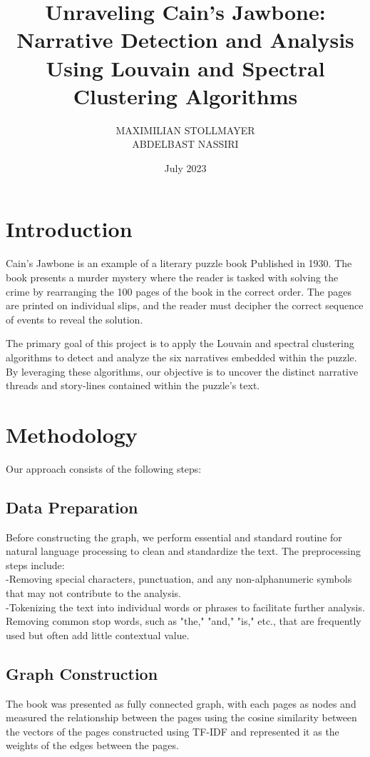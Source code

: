 \documentclass{article}
\title{Unraveling Cain's Jawbone: Narrative Detection and Analysis Using Louvain and Spectral Clustering Algorithms}
\author{MAXIMILIAN STOLLMAYER \\ 
ABDELBAST NASSIRI}
\date{July 2023}
\begin{document}
\maketitle

\section{Introduction}
Cain's Jawbone  is an example of a literary puzzle book Published in 1930. The book presents a murder mystery where the reader is tasked with solving the crime by rearranging the 100 pages of the book in the correct order. The pages are printed on individual slips, and the reader must decipher the correct sequence of events to reveal the solution.

The primary goal of this project is to apply the Louvain and spectral clustering algorithms to detect and analyze the six narratives embedded within the puzzle. By leveraging these algorithms, our objective is to uncover the distinct narrative threads and story-lines contained within the puzzle's text.
\section{Methodology}
Our approach consists of the following steps:

\subsection{Data Preparation}
Before constructing the graph, we perform essential and standard routine for natural language processing to clean and standardize the text. The preprocessing steps include:\\
-Removing special characters, punctuation, and any non-alphanumeric symbols that may not contribute to the analysis.\\
-Tokenizing the text into individual words or phrases to facilitate further analysis.
Removing common stop words, such as "the," "and," "is," etc., that are frequently used but often add little contextual value.

\subsection{Graph Construction}
The book was presented as fully connected graph, with each pages as nodes and measured the relationship between the pages using the cosine similarity between the vectors of the pages constructed using TF-IDF and represented it as the weights of the edges between the pages.
\end{document}

